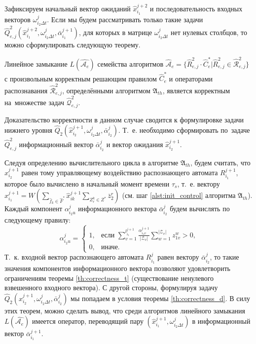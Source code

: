 Зафиксируем начальный вектор ожиданий $\hat x_{i_1}^{j+2}$ и последовательность входных векторов $\omega_{i_2\Delta{t}}^j$. Если мы будем рассматривать только такие задачи $\hat Q_{e,j}^2(\hat x_{i_1}^{j+2},\omega_{i_2\Delta{t}}^j,\bar\alpha_{i_1}^{j+1})$, для которых в матрице $\omega_{i_2\Delta{t}}^j$ нет нулевых столбцов, то можно сформулировать следующую теорему.
		
\begin{Theorem}
	Линейное замыкание $L(\hat{\mathcal A_e})$ семейства алгоритмов $\hat{\mathcal A}_e=\{\hat R_{e,j}^2\cdot\hat C_e^*|\hat R_{e,j}^2\in\hat{\mathcal R}_{e,j}^2\}$ с произвольным корректным решающим правилом $\hat C_e^*$ и операторами распознавания $\hat{\mathcal R}_{e,j}^2$, определёнными алгоритмом $\mathfrak A_{th}$, является корректным на~множестве задач $\hat{\mathcal Q}_{e,j}^2$.
\end{Theorem}

\begin{Proof}
	Доказательство корректности в данном случае сводится к формулировке задачи нижнего уровня $\hat Q_2(\hat x_{i_2}^{j+1},\omega_{i_2\Delta t}^j,\bar\alpha_{i_2}^j)$. Т.~е. необходимо сформировать по~задаче $\hat Q_{e,j}^2$ информационный вектор $\bar\alpha_{i_2}^j$ и вектор ожидания $\hat x_{i_2}^{j+1}$.
	
	Следуя определению вычислительного цикла в алгоритме $\mathfrak A_{th}$, будем считать, что $\hat x_{i_2}^{j+1}$ равен тому управляющему воздействию распознающего автомата $R_{i_1}^{j+1}$, которое было вычислено в начальный момент времени $\tau_s$, т.~е. вектору $\hat x_{i_1}^{j+1}=W(\sum_{\hat f_k\in\hat F^*}\hat x_{ik}^{j+1}\sum_{Z_r^k\in Z^*}\bar z_2^r)$ (см. шаг \ref{alst:init_control} алгоритма $\mathfrak A_{th}$). Каждый компонент $\alpha_{i_2u}^j$ информационного вектора $\bar\alpha_{i_2}^j$ будем вычислять по следующему правилу:
	\begin{equation}
		\alpha_{i_2u}^j=\begin{cases}
			1, & \text{если $\sum\limits_{v=1}^{l_{i_1}^{j+1}}\frac{\alpha_{i_1v}^{j+1}}{|\mathcal{Z}_v|}\sum\limits_{w=1}^{|\mathcal{Z}_v|}z_{1v}^w>0$,}\\
			
			0, & \text{иначе.}
		\end{cases}
	\end{equation}
	Т.~к. входной вектор распознающего автомата $R_{i_1}^j$ равен вектору $\bar\alpha_{i_2}^j$, то такие значения компонентов информационного вектора позволяют удовлетворить ограничениям теоремы \ref{th:correctness_t} (существование ненулевого взвешенного входного вектора). С другой стороны, формулируя задачу $\hat Q_2(\hat x_{i_2}^{j+1},\omega_{i_2\Delta t}^j,\bar\alpha_{i_2}^j)$ мы попадаем в условия теоремы \ref{th:correctness_d}. В силу этих теорем, можно сделать вывод, что среди алгоритмов линейного замыкания $L(\hat{\mathcal A_e})$ имеется оператор, переводящий пару $(\hat x_{i_1}^{j+1},\omega_{i_2\Delta t}^j)$ в информационный вектор $\bar\alpha_{i_1}^{j+1}$.
\end{Proof}

